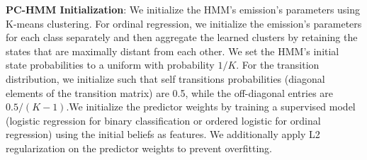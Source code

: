 

\textbf{PC-HMM Initialization}: We initialize the HMM's emission's parameters using K-means clustering. For ordinal regression, we initialize the emission's parameters for each class separately and then aggregate the learned clusters by retaining the states that are maximally distant from each other. We set the HMM's initial state probabilities to a uniform with probability $1/K$. For the transition distribution, we initialize such that self transitions probabilities (diagonal elements of the transition matrix) are 0.5, while the off-diagonal entries are $0.5/(K-1)$.We initialize the predictor weights by training a supervised model (logistic regression for binary classification or ordered logistic for ordinal regression) using the initial beliefs as features. We additionally apply L2 regularization on the predictor weights to prevent overfitting.


